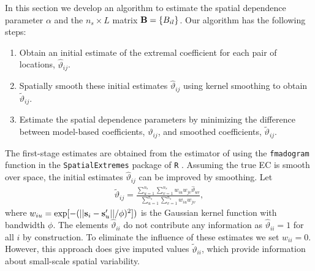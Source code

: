 \documentclass[aoas]{imsart}
\begin{document}
In this section we develop an algorithm to estimate the spatial dependence parameter $\alpha$ and the $n_s\times L$ matrix $\mathbf{B} = \{B_{il}\}$.
Our algorithm has the following steps:
\begin{enumerate}[(1)]
  \item Obtain an initial estimate of the extremal coefficient for each pair of locations, ${\hat \vartheta}_{ij}$.
  \item Spatially smooth these initial estimates ${\hat \vartheta}_{ij}$ using kernel smoothing to obtain ${\tilde \vartheta}_{ij}$.
  \item Estimate the spatial dependence parameters by minimizing the difference between model-based coefficients, $\vartheta_{ij}$, and smoothed coefficients, ${\tilde \vartheta}_{ij}$.
\end{enumerate}


The first-stage estimates are obtained from the estimator of \citet{Schlather2003} using the \texttt{fmadogram} function in the \texttt{SpatialExtremes} \citep{Ribatet2015} package of \texttt{R} \citep{Rmanual}.
Assuming the true EC is smooth over space, the initial estimates ${\hat \vartheta}_{ij}$ can be improved by smoothing.
Let
\begin{align} \label{ebeq:EChat2}
  {\tilde \vartheta}_{ij} = \frac{\sum_{u=1}^{n_s}\sum_{v=1}^{n_s} w_{iu}w_{jv}{\hat \vartheta}_{uv}}
  {\sum_{u=1}^{n_s}\sum_{v=1}^{n_s} w_{iu}w_{jv}},
\end{align}
where $w_{iu} = \exp[-(||\mathbf{s}_i-\mathbf{s}_u'||/\phi)^2])$ is the Gaussian kernel function with bandwidth $\phi$.
The elements ${\hat \vartheta}_{ii}$ do not contribute any information as ${\hat \vartheta}_{ii}=1$ for all $i$ by construction.
To eliminate the influence of these estimates we set $w_{ii}=0$.
However, this approach does give imputed values ${\tilde \vartheta}_{ii}$, which provide information about small-scale spatial variability.
\end{document}
